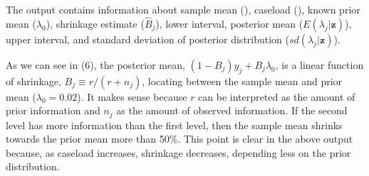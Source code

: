 \documentclass[article]{jss}
\begin{document}
The output contains information about sample mean (), caseload (), known prior mean ($\lambda_{0}$), shrinkage estimate ($\hat{B}_{j}$), lower interval, posterior mean ($E(\lambda_{j}\vert \textbf{z})$), upper interval, and standard deviation of posterior distribution ($sd(\lambda_{j}\vert \textbf{z})$).


As we can see in (6), the posterior mean, $(1-B_{j})y_{j} + B_{j}\lambda_{0}$, is a linear function of shrinkage, $B_{j}\equiv r / (r + n_{j})$, locating between the sample mean and prior mean ($\lambda_{0}=0.02$). It makes sense because $r$ can be interpreted as the amount of prior information and $n_{j}$ as the amount of observed information. If the second level has more information than the first level, then the sample mean shrinks towards the prior mean more than 50\%. This point is clear in the above output because, as caseload increases, shrinkage decreases, depending less on the prior distribution.
\end{document}
